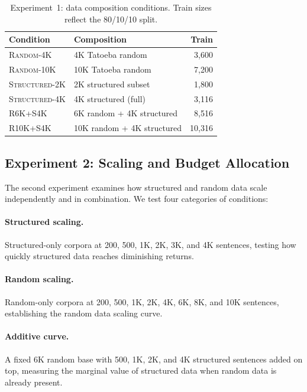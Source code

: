 \documentclass[11pt]{article}
\begin{document}
\begin{table}[t]
\centering
\small
\caption{Experiment~1: data composition conditions. Train sizes reflect the 80/10/10 split.}
\label{tab:exp1_conditions}
\begin{tabular}{llr}
\toprule
\textbf{Condition} & \textbf{Composition} & \textbf{Train} \\
\midrule
\textsc{Random-4K}       & 4K Tatoeba random        & 3,600 \\
\textsc{Random-10K}      & 10K Tatoeba random       & 7,200 \\
\textsc{Structured-2K}   & 2K structured subset     & 1,800 \\
\textsc{Structured-4K}   & 4K structured (full)     & 3,116 \\
\textsc{R6K+S4K}         & 6K random + 4K structured & 8,516 \\
\textsc{R10K+S4K}        & 10K random + 4K structured & 10,316 \\
\bottomrule
\end{tabular}
\end{table}

\subsection{Experiment 2: Scaling and Budget Allocation}

The second experiment examines how structured and random data scale independently and in combination. We test four categories of conditions:

\paragraph{Structured scaling.} Structured-only corpora at 200, 500, 1K, 2K, 3K, and 4K sentences, testing how quickly structured data reaches diminishing returns.

\paragraph{Random scaling.} Random-only corpora at 200, 500, 1K, 2K, 4K, 6K, 8K, and 10K sentences, establishing the random data scaling curve.

\paragraph{Additive curve.} A fixed 6K random base with 500, 1K, 2K, and 4K structured sentences added on top, measuring the marginal value of structured data when random data is already present.
\end{document}
